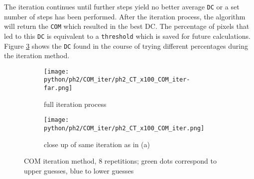 The iteration continues until further steps yield no better average \texttt{DC} or a set number of steps has been performed.
After the iteration process, the algorithm will return the \texttt{COM} which resulted in the best DC.
The percentage of pixels that led to this \texttt{DC} is equivalent to a \texttt{threshold} which is saved for future calculations.
Figure \ref{fig:COM_iteration} shows the \texttt{DC}  found in the course of trying different percentages during the iteration method.


\begin{figure}[!thb]
\centering
  \begin{subfigure}[b]{1\textwidth}
  \centering
    \texttt{[image: python/ph2/COM\_iter/ph2\_CT\_x100\_COM\_iter-far.png]}
    \caption{full iteration process}
    \label{fig:CT_x100_iteration}
  \end{subfigure}
  \begin{subfigure}[b]{1\textwidth}
  \centering
    \texttt{[image: python/ph2/COM\_iter/ph2\_CT\_x100\_COM\_iter.png]}
     \caption{close up of same iteration as in (a)}
     \label{fig:MR_x100_iteration}
  \end{subfigure}
  \caption{COM iteration method, 8 repetitions; green dots correspond to upper guesses, blue to lower guesses}
  \label{fig:COM_iteration}
\end{figure}

